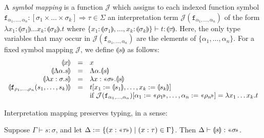 \documentclass[runningheads,a4paper]{llncs}
\newcommand{\Termmap}{\mathcal{J}}
\newcommand{\typeinterpret}[1]{\text{\guillemotleft} #1\! \text{\guillemotright}}
\newcommand{\interpret}[1]{\llparenthesis #1 \rrparenthesis}
\newcommand{\arrtype}{\Rightarrow}
\newcommand{\abs}[2]{\lambda #1.#2}
\newcommand{\tabs}[2]{\Lambda #1.#2}
\newcommand{\afun}{\mathtt{f}}
\begin{document}
\begin{definition}
A \emph{symbol mapping} is a function $\Termmap$ which assigns to each
indexed function symbol $\mathtt{f}_{\alpha_1,\dots,\alpha_n} :
[\sigma_1 \times \dots \times \sigma_k] \arrtype \tau \in \Sigma$ an
interpretation term $\Termmap(\mathtt{f}_{\alpha_1,\dots,\alpha_n})$
of the form $\abs{x_1 : \interpret{\sigma_1} \dots x_k : \interpret{
\sigma_k}}{t}$ where $\{ x_1 : \interpret{\sigma_1}, \dots, x_k :
\interpret{\sigma_k} \} \vdash t : \interpret{\tau}$.  Here, the only
type variables that may occur in $\Termmap(\mathtt{f}_{\alpha_1,\dots,
\alpha_n})$ are the elements of $\{\alpha_1,\dots,\alpha_n\}$.
For a fixed symbol mapping $\Termmap$, we define $\interpret{s}$ as
follows:
\[
\begin{array}{rcl}
\interpret{x} & = & x \\
\interpret{\tabs{\alpha}{s}} & = & \tabs{\alpha}{\interpret{s}} \\
\interpret{\abs{x:\sigma}{s}} & = & \abs{x:\typeinterpret{\sigma}}{
  \interpret{s}} \\
\interpret{\afun_{\rho_1,\dots,\rho_n}(s_1,\dots,s_k)} & = &
  t[x_1:=\interpret{s_1},\dots,x_k:=\interpret{s_k}] \\
  & & \text{if}\ \Termmap(\afun_{\alpha_1,\dots,\alpha_n})[\alpha_1:=
  \typeinterpret{\rho_1},\dots,\alpha_n:=\typeinterpret{\rho_n}] =
  \abs{x_1 \dots x_k}{t} \\
\end{array}
\]
\end{definition}

Interpretation mapping preserves typing, in a sense:

\begin{lemma}
Suppose $\Gamma \vdash s : \sigma$, and let $\Delta := \{ (x :
\typeinterpret{\tau}) \mid (x : \tau) \in \Gamma \}$.  Then
$\Delta \vdash \interpret{s} : \typeinterpret{\sigma}$.
\end{lemma}
\end{document}
